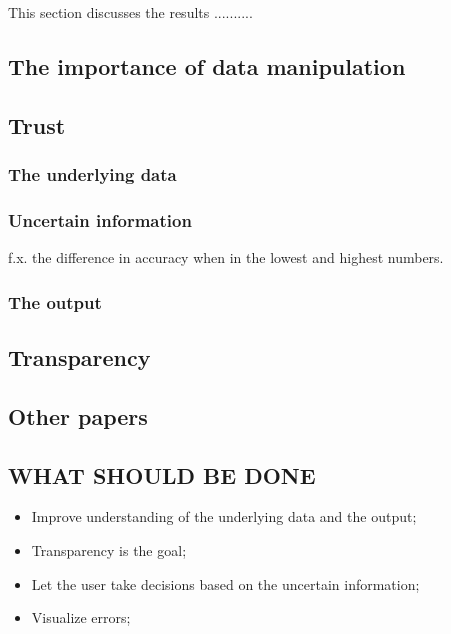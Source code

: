 This section discusses the results ..........

\subsection{The importance of data manipulation}

\subsection{Trust}

\subsubsection{The underlying data}

\subsubsection{Uncertain information}
f.x. the difference in accuracy when in the lowest and highest numbers.

\subsubsection{The output}

\subsection{Transparency}

\subsection{Other papers}

\subsection{WHAT SHOULD BE DONE}
\begin{itemize}
\item Improve understanding of the underlying data and the output;
\item Transparency is the goal;
\item Let the user take decisions based on the uncertain information;
\item Visualize errors;
\end{itemize}

